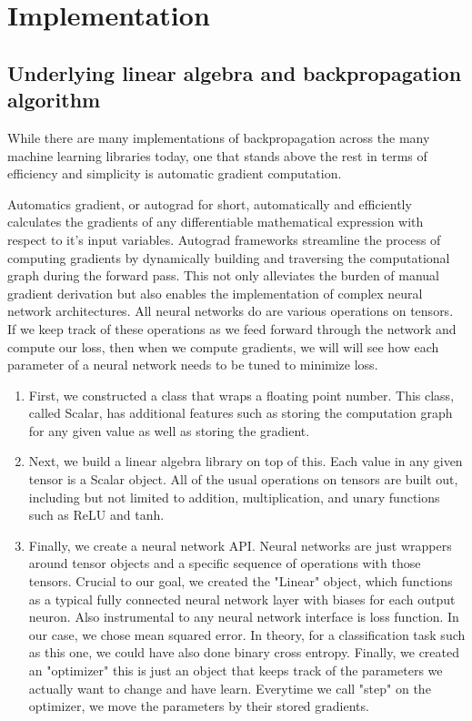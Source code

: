 \documentclass[letterpaper, 12pt]{article}
\begin{document}
\section{Implementation}

\subsection{Underlying linear algebra and backpropagation algorithm}
While there are many implementations of backpropagation across the many machine learning libraries today, one that stands above the rest in terms of efficiency and simplicity is automatic gradient computation.

Automatics gradient, or autograd for short, automatically and efficiently calculates the gradients of any differentiable mathematical expression with respect to it's input variables. Autograd frameworks streamline the process of computing gradients by dynamically building and traversing the computational graph during the forward pass. This not only alleviates the burden of manual gradient derivation but also enables the implementation of complex neural network architectures. All neural networks do are various operations on tensors. If we keep track of these operations as we feed forward through the network and compute our loss, then when we compute gradients, we will will see how each parameter of a neural network needs to be tuned to minimize loss.

\begin{enumerate}
\item  First, we constructed a class that wraps a floating point number. This class, called Scalar, has additional features such as storing the computation graph for any given value as well as storing the gradient.
\item Next, we build a linear algebra library on top of this. Each value in any given tensor is a Scalar object. All of the usual operations on tensors are built out, including but not limited to addition, multiplication, and unary functions such as ReLU and tanh.
\item Finally, we create a neural network API. Neural networks are just wrappers around tensor objects and a specific sequence of operations with those tensors. Crucial to our goal, we created the "Linear" object, which functions as a typical fully connected neural network layer with biases for each output neuron. Also instrumental to any neural network interface is loss function. In our case, we chose mean squared error. In theory, for a classification task such as this one, we could have also done binary cross entropy. Finally, we created an "optimizer" this is just an object that keeps track of the parameters we actually want to change and have learn. Everytime we call "step" on the optimizer, we move the parameters by their stored gradients.
\end{enumerate}
\end{document}
